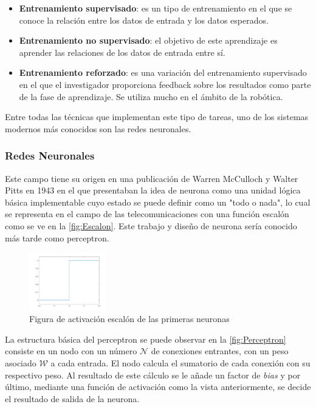 \begin{itemize}
    \item \textbf{Entrenamiento supervisado}: es un tipo de entrenamiento en el que se conoce la relación entre los datos de entrada y los datos esperados. 
    \item \textbf{Entrenamiento no supervisado}: el objetivo de este aprendizaje es aprender las relaciones de los datos de entrada entre sí.
    \item \textbf{Entrenamiento reforzado}: es una variación del entrenamiento supervisado en el que el investigador proporciona feedback sobre los resultados como parte de la fase de aprendizaje. Se utiliza 
    mucho en el ámbito de la robótica.
\end{itemize}

Entre todas las técnicas que implementan este tipo de tareas, uno de los sistemas modernos más conocidos son las redes neuronales.

\subsubsection{Redes Neuronales}

Este campo tiene su origen en una publicación de Warren McCulloch y Walter Pitts en 1943\cite{mccullochLOGICALCALCULUSIDEAS} en el que presentaban la idea de neurona como una unidad lógica básica 
implementable cuyo estado se puede definir como un "todo o nada", lo cual se representa en el campo de las telecomunicaciones con una función escalón como se ve en la \autoref{fig:Escalon}. Este 
trabajo y diseño de neurona sería conocido más tarde como perceptron.

\begin{figure}[H]
    \centering
    \includegraphics[width=0.3\textwidth]{images/4/Escalon.png}
    \caption{Figura de activación escalón de las primeras neuronas}
    \label{fig:Escalon}
\end{figure}

La estructura básica del perceptron se puede observar en la \autoref{fig:Perceptron} consiste en un nodo con un número \(\mathcal{N}\) de conexiones entrantes, con un peso asociado \(\mathcal{W}\) 
a cada entrada. El nodo calcula el sumatorio de cada conexión con su respectivo peso. Al resultado de este cálculo se le añade un factor de \textit{bias} y por último, mediante una función de 
activación como la vista anteriormente, se decide el resultado de salida de la neurona. 

